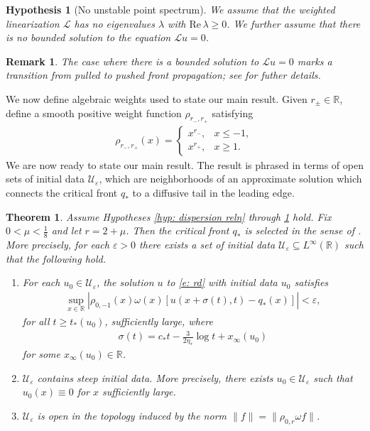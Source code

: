 \documentclass[11pt]{article}
\newcommand{\eps}{\varepsilon}
\newcommand{\R}{\mathbb{R}}
\newcommand{\mcl}{\mathcal{L}}
\renewcommand{\Re}{\mathrm{Re} \,}
\newtheorem{thm}{Theorem}
\newtheorem{hyp}{Hypothesis}
\newtheorem{remark}[prop]{Remark}
\numberwithin{equation}{section}
\numberwithin{prop}{section}
\begin{document}
\begin{hyp}[No unstable point spectrum]\label{hyp: point spectrum}
	We assume that the weighted linearization $\mcl$ has no eigenvalues $\lambda$ with $\Re \lambda \geq 0$. We further assume that there is no bounded solution to the equation $\mcl u = 0$. 
\end{hyp}

\begin{remark}
	The case where there is a bounded solution to $\mcl u =0$ marks a transition from pulled to pushed front propagation; see \cite{AveryHolzerScheel} for futher details. 
\end{remark}

We now define algebraic weights used to state our main result. Given $r_\pm \in \R$, define a smooth positive weight function $\rho_{r_-, r_+}$ satisfying
\begin{align}
\rho_{r_-, r_+} (x) = \begin{cases}
x^{r_-}, & x \leq -1, \\
x^{r_+}, & x \geq 1.  
\end{cases} \label{e: alg weights}
\end{align} 
We are now ready to state our main result. The result is phrased in terms of open sets of initial data $\mathcal{U}_\eps$, which are neighborhoods of an approximate solution which connects the critical front $q_*$ to a diffusive tail in the leading edge. 

\begin{thm}\label{t: main}
	Assume Hypotheses \ref{hyp: dispersion reln} through \ref{hyp: point spectrum} hold. Fix $0 < \mu < \frac{1}{8}$ and let $r = 2+\mu$. Then the critical front $q_*$ is selected in the sense of \cite[Definition 1]{CAMS}. More precisely, for each $\eps > 0$ there exists a set of initial data $\mathcal{U}_\eps \subseteq L^\infty (\R)$ such that the following hold.
	\begin{enumerate}
		\item For each $u_0 \in \mathcal{U}_\eps$, the solution $u$ to \eqref{e: rd} with initial data $u_0$ satisfies
		\begin{align}
		\sup_{x \in \R} |\rho_{0,-1} (x) \omega(x) [ u(x + \sigma(t), t) - q_*(x)]| < \eps, 
		\end{align}
		for all $t \geq t_*(u_0)$, sufficiently large, where 
		\begin{align}
		\sigma(t) = c_* t - \frac{3}{2 \eta_*} \log t + x_\infty (u_0)
		\end{align}
		for some $x_\infty (u_0) \in \R$. 
		\item $\mathcal{U}_\eps$ contains \emph{steep} initial data. More precisely, there exists $u_0 \in \mathcal{U}_\eps$ such that $u_0 (x) \equiv 0$ for $x$ sufficiently large. 
		\item $\mathcal{U}_\eps$ is open in the topology induced by the norm $\| f \| = \| \rho_{0, r} \omega f \|$. 
	\end{enumerate}
\end{thm}
\end{document}

